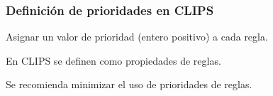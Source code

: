 \subsubsection{Definición de prioridades en CLIPS}
\begin{compactitem}
  \item Asignar un valor de prioridad (entero positivo) a cada regla.
  \item En CLIPS se definen como propiedades de reglas.
  \item Se recomienda minimizar el uso de prioridades de reglas.
\end{compactitem}


